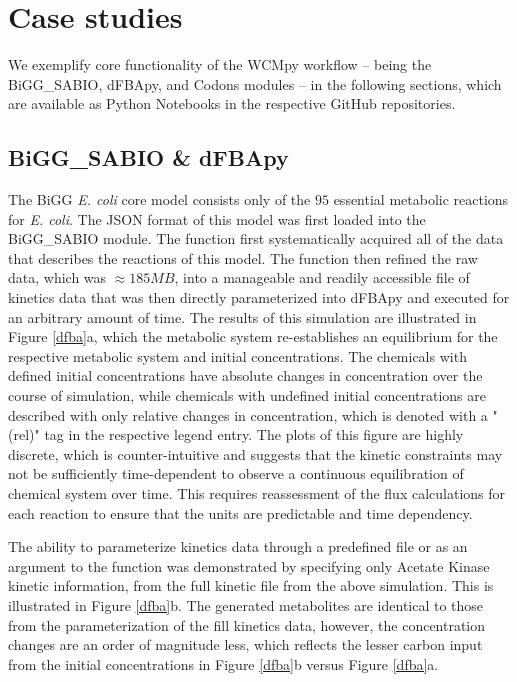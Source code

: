 \section*{Case studies}
We exemplify core functionality of the WCMpy workflow -- being the BiGG\_SABIO, dFBApy, and Codons modules -- in the following sections, which are available as Python Notebooks in the respective GitHub repositories.

\subsection*{BiGG\_SABIO \& dFBApy}
The BiGG \textit{E. coli} core model consists only of the $95$ essential metabolic reactions for \textit{E. coli}. The JSON format of this model was first loaded into the BiGG\_SABIO module. The  function first systematically acquired all of the data that describes the reactions of this model. The  function then refined the raw data, which was $\approx 185 MB$, into a manageable and readily accessible file of kinetics data that was then directly parameterized into dFBApy and executed for an arbitrary amount of time. The results of this simulation are illustrated in Figure \ref{dfba}a, which the metabolic system re-establishes an equilibrium for the respective metabolic system and initial concentrations. The chemicals with defined initial concentrations have absolute changes in concentration over the course of simulation, while chemicals with undefined initial concentrations are described with only relative changes in concentration, which is denoted with a "(rel)" tag in the respective legend entry. The plots of this figure are highly discrete, which is counter-intuitive and suggests that the kinetic constraints may not be sufficiently time-dependent to observe a continuous equilibration of chemical system over time. This requires reassessment of the flux calculations for each reaction to ensure that the units are predictable and time dependency.

The ability to parameterize kinetics data through a predefined file or as an argument to the  function was demonstrated by specifying only Acetate Kinase kinetic information, from the full kinetic file from the above simulation. This is illustrated in Figure \ref{dfba}b. The generated metabolites are identical to those from the parameterization of the fill kinetics data, however, the concentration changes are an order of magnitude less, which reflects the lesser carbon input from the initial concentrations in Figure \ref{dfba}b versus Figure \ref{dfba}a.

